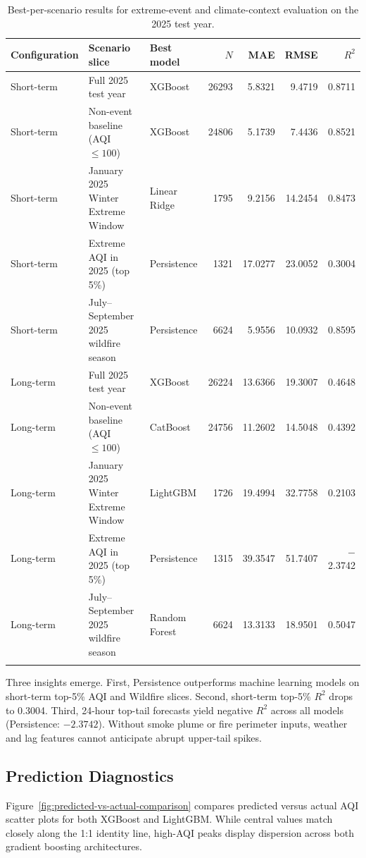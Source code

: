 \documentclass[pdflatex,sn-mathphys-num]{sn-jnl}
\begin{document}
\begin{table}[htbp]
\caption{Best-per-scenario results for extreme-event and climate-context evaluation on the 2025 test year.}\label{tab:scenario-context-results}
\footnotesize
\setlength{\tabcolsep}{2pt}
\begin{tabular*}{\textwidth}{@{\extracolsep\fill}lllrrrr}
\toprule
Configuration & Scenario slice & Best model & $N$ & MAE & RMSE & $R^2$ \\
\midrule
Short-term & Full 2025 test year & XGBoost & 26293 & 5.8321 & 9.4719 & 0.8711 \\
Short-term & Non-event baseline (AQI $\leq 100$) & XGBoost & 24806 & 5.1739 & 7.4436 & 0.8521 \\
Short-term & January 2025 Winter Extreme Window & Linear Ridge & 1795 & 9.2156 & 14.2454 & 0.8473 \\
Short-term & Extreme AQI in 2025 (top 5\%) & Persistence & 1321 & 17.0277 & 23.0052 & 0.3004 \\
Short-term & July--September 2025 wildfire season & Persistence & 6624 & 5.9556 & 10.0932 & 0.8595 \\
Long-term & Full 2025 test year & XGBoost & 26224 & 13.6366 & 19.3007 & 0.4648 \\
Long-term & Non-event baseline (AQI $\leq 100$) & CatBoost & 24756 & 11.2602 & 14.5048 & 0.4392 \\
Long-term & January 2025 Winter Extreme Window & LightGBM & 1726 & 19.4994 & 32.7758 & 0.2103 \\
Long-term & Extreme AQI in 2025 (top 5\%) & Persistence & 1315 & 39.3547 & 51.7407 & $-$2.3742 \\
Long-term & July--September 2025 wildfire season & Random Forest & 6624 & 13.3133 & 18.9501 & 0.5047 \\
\botrule
\end{tabular*}
\end{table}

Three insights emerge. First, Persistence outperforms machine learning models on short-term top-5\% AQI and Wildfire slices. Second, short-term top-5\% $R^2$ drops to 0.3004. Third, 24-hour top-tail forecasts yield negative $R^2$ across all models (Persistence: $-2.3742$). Without smoke plume or fire perimeter inputs, weather and lag features cannot anticipate abrupt upper-tail spikes.

\subsection{Prediction Diagnostics}\label{subsec:diagnostics}
Figure~\ref{fig:predicted-vs-actual-comparison} compares predicted versus actual AQI scatter plots for both XGBoost and LightGBM. While central values match closely along the 1:1 identity line, high-AQI peaks display dispersion across both gradient boosting architectures.
\end{document}
